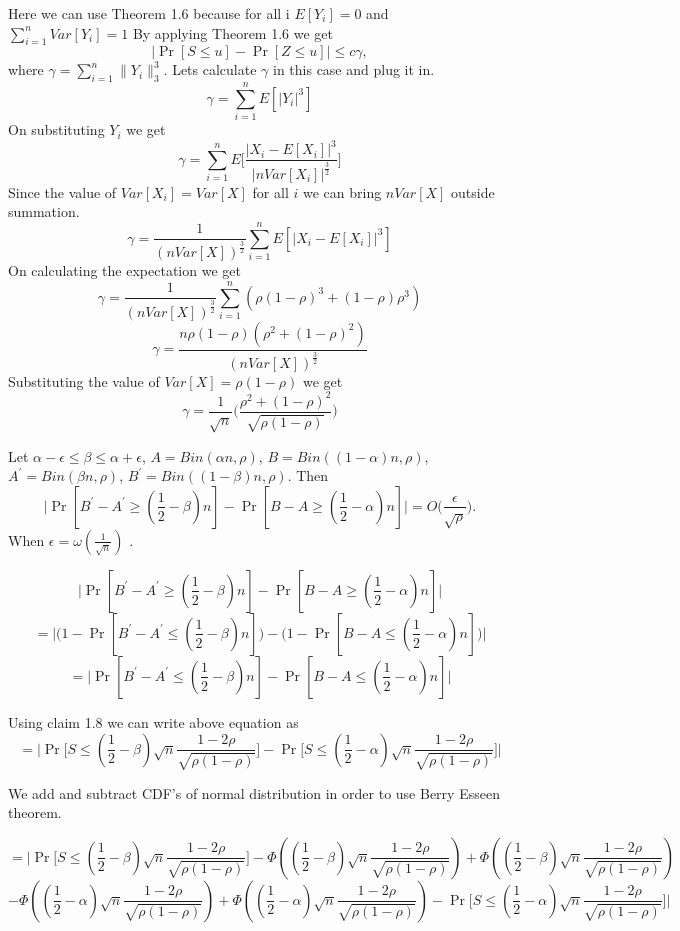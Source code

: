 \documentclass[11pt]{article}
\begin{document}
\ECM

\BPF
Here we can use Theorem 1.6 because for all i $E[Y_i] = 0$ and $\sum_{i=1}^{n}Var[Y_i] = 1$ By applying Theorem 1.6 we get $$\big| \Pr[S \leq u] - \Pr[Z \leq u] \big| \leq c\gamma,$$ where $\gamma = \sum\limits_{i=1}^{n} \|Y_i\|^{3}_{3}$. Lets calculate $\gamma$ in this case and plug it in.  $$ \gamma = \sum_{i=1}^{n}E[|Y_i|^3]$$ On substituting $Y_i$ we get 
$$\gamma = \sum_{i=1}^{n}E\Bigg[ \frac{|X_i - E[X_i]|^3}{|nVar[X_i]|^{\frac{3}{2}}} \Bigg]$$
Since the value of $Var[X_i] = Var[X]$ for all $i$ we can bring $nVar[X]$ outside summation.
$$ \gamma= \frac{1}{(nVar[X])^{\frac{3}{2}}} \sum_{i=1}^{n} E[|X_i - E[X_i]|^3]$$
On calculating the expectation we get
$$ \gamma= \frac{1}{(nVar[X])^{\frac{3}{2}}} \sum_{i=1}^{n} (\rho(1-\rho)^3 + (1-\rho)\rho^3)$$
$$ \gamma= \frac{n\rho(1-\rho)(\rho^2 + (1-\rho)^2)}{(nVar[X])^{\frac{3}{2}}}   $$
Substituting the value of $Var[X]= \rho(1-\rho)$ we get 
$$\gamma =  \frac{1}{\sqrt{n}} \Big( \frac{\rho^2 + (1-\rho)^2}{\sqrt{\rho(1-\rho)}} \Big)$$

\EPF





\BCM
Let $\alpha - \epsilon \leq \beta \leq \alpha + \epsilon$, $A = Bin(\alpha n, \rho)$, $B = Bin((1-\alpha)n, \rho)$, $A^{'} = Bin(\beta n, \rho)$, $B^{'} = Bin((1-\beta) n, \rho)$. Then $$ \big| \Pr[B^{'}- A^{'}  \geq (\frac{1}{2} - \beta)n] - \Pr[B-A \geq (\frac{1}{2} - \alpha)n] \big| = O\Big(\frac{\epsilon}{\sqrt{\rho}}\Big).$$ When $\epsilon = \omega(\frac{1}{\sqrt{n}})$ .

\ECM

\BPF
$$\big| \Pr[B^{'}- A^{'}  \geq (\frac{1}{2} - \beta)n] - \Pr[B-A \geq (\frac{1}{2} - \alpha)n] \big|$$ $$= \big|\big(1- \Pr[B^{'}- A^{'}  \leq (\frac{1}{2} - \beta)n]\big) - \big(1 - \Pr[B-A \leq (\frac{1}{2} - \alpha)n]\big) \big|$$  $$= \big| \Pr[B^{'}- A^{'}  \leq (\frac{1}{2} - \beta)n] - \Pr[B-A \leq (\frac{1}{2} - \alpha)n] \big|$$

Using claim 1.8 we can write above equation as
 $$= \Bigg| \Pr\bigg[S \leq (\frac{1}{2} - \beta)\sqrt{n} \frac{1-2\rho}{\sqrt{\rho(1-\rho)}}   \bigg] - \Pr\bigg[S \leq (\frac{1}{2} - \alpha)\sqrt{n} \frac{1-2\rho}{\sqrt{\rho(1-\rho)}}   \bigg] \Bigg| $$   

We add and subtract CDF's of normal distribution in order to use Berry Esseen theorem.

$$ =  \Bigg| \Pr\bigg[S \leq (\frac{1}{2} - \beta)\sqrt{n} \frac{1-2\rho}{\sqrt{\rho(1-\rho)}} \bigg] - \Phi((\frac{1}{2} - \beta)\sqrt{n} \frac{1-2\rho}{\sqrt{\rho(1-\rho)}}) + \Phi((\frac{1}{2} - \beta)\sqrt{n} \frac{1-2\rho}{\sqrt{\rho(1-\rho)}})$$  $$- \Phi((\frac{1}{2} - \alpha)\sqrt{n} \frac{1-2\rho}{\sqrt{\rho(1-\rho)}}) + \Phi((\frac{1}{2} - \alpha)\sqrt{n} \frac{1-2\rho}{\sqrt{\rho(1-\rho)}})- \Pr\bigg[S \leq (\frac{1}{2} - \alpha)\sqrt{n} \frac{1-2\rho}{\sqrt{\rho(1-\rho)}}\bigg] \Bigg| $$  
\end{document}
